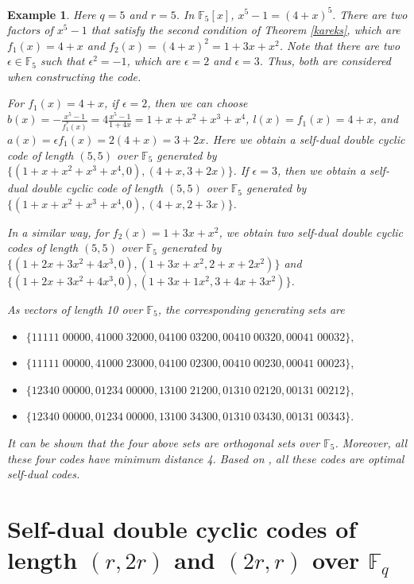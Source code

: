 \documentclass[12pt]{article}
\newtheorem{example}[theorem]{Example}
\begin{document}
	\begin{example}\label{exampleF5b}
		Here $q=5$ and $r=5$. In $\mathbb{F}_5[x]$, $x^5-1=(4+x)^5.$ There are two factors of $x^5-1$ that satisfy the second condition of Theorem \ref{kareks}, which are $f_1(x)=4+x$ and $f_2(x)=(4+x)^2=1+3x+x^2$. Note that there are two $\epsilon\in\mathbb{F}_5$ such that $\epsilon^2=-1$, which are $\epsilon=2$ and $\epsilon=3$. Thus, both are considered when constructing the code.
		
		For $f_1(x)=4+x$, if $\epsilon=2$, then we can choose $b(x)=-\frac{x^5-1}{f_1^{*}(x)}=4\frac{x^5-1}{1+4x}=1+x+x^2+x^3+x^4$, $l(x)= f_1(x)=4+x$, and $a(x)=\epsilon f_1(x)=2(4+x)=3+2x$. Here we obtain a self-dual double cyclic code of length $(5,5)$ over $\mathbb{F}_5$ generated by $\{(1+x+x^2+x^3+x^4,0),(4+x,3+2x)\}$. If $\epsilon=3$, then we obtain a self-dual double cyclic code of length $(5,5)$ over $\mathbb{F}_5$ generated by $\{(1+x+x^2+x^3+x^4,0),(4+x,2+3x)\}$.
		
		In a similar way, for $f_2(x)=1+3x+x^2$, we obtain two self-dual double cyclic codes of length $(5,5)$ over $\mathbb{F}_5$ generated by $\{(1+2x+3x^2+4x^3,0),(1+3x+x^2,2+x+2x^2)\}$ and $\{(1+2x+3x^2+4x^3,0),(1+3x+1x^2,3+4x+3x^2)\}$.
		
		As vectors of length 10 over $\mathbb{F}_5$, the corresponding generating sets are
		\begin{itemize}
			\item $\{11111\;00000,41000\;32000,04100\;03200,00410\;00320,00041\;00032\},$
			\item $\{11111\;00000,41000\;23000,04100\;02300,00410\;00230,00041\;00023\},$
			\item $\{12340\;00000,01234\;00000,13100\;21200,01310\;02120,00131\;00212\},$
			\item $\{12340\;00000,01234\;00000,13100\;34300,01310\;03430,00131\;00343\}.$
		\end{itemize}
		It can be shown that the four above sets are orthogonal sets over $\mathbb{F}_5$.
		Moreover, all these four codes have minimum distance 4. Based on \cite{Harada}, all these codes are optimal self-dual codes.
	\end{example}
	
	\section{Self-dual double cyclic codes of length $(r,2r)$ and $(2r,r)$ over $\mathbb{F}_{q}$}
	
\end{document}
